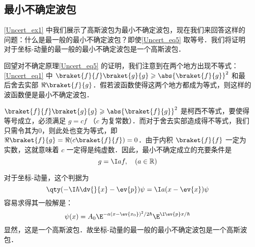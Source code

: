 \subsection{最小不确定波包}
\autoref{Uncert_ex1} 中我们展示了高斯波包为最小不确定波包，现在我们来回答这样的问题：什么是最一般的最小不确定波包？即使\autoref{Uncert_eq5} 取等号．我们将证明对于坐标-动量的最一般的最小不确定波包是一个高斯波包．

回望对不确定原理\autoref{Uncert_eq5} 的证明，我们注意到在两个地方出现不等式：\autoref{Uncert_eq1} 中 $\braket{f}{f} \braket{g}{g} \geqslant \abs{\braket{f}{g}}^2$ 和最后舍去实部 $\Re\braket{f}{g}$．假若波函数使得这两个地方都成为等式，则这样的波函数便是最小不确定波包．

$\braket{f}{f} \braket{g}{g} \geqslant \abs{\braket{f}{g}}^2$ 是柯西不等式，要使得等号成立，必须满足 $g=cf$ （$c$ 为复常数）．而对于舍去实部造成得不等式，我们只需令其为0，则此处也变为等式，即 $\Re\braket{f}{g}=\Re( c\braket{f}{f})=0$．由于内积 $\braket{f}{f}$ 一定为实数，这就意味着 $c$ 一定得是纯虚数．因此，最小不确定成立的充要条件是
\begin{equation}
g=\I af,\quad(a\in \mathbb{R})
\end{equation}

对于坐标-动量，这个判据为
\begin{equation}
\qty(-\I\hbar\dv{}{x}-\ev{p})\psi=\I a(x-\ev{x})\psi
\end{equation}
容易求得其一般解是：
\begin{equation}
\psi(x)=A_0\E^{-a(x-\ev{x_0})^2/2\hbar}\E^{\I \ev{p}x/\hbar}
\end{equation}
显然，这是一个高斯波包．故坐标-动量的最一般的最小不确定波包是一个高斯波包．

